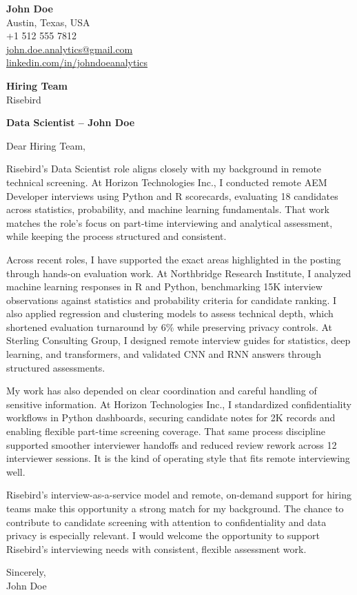 \documentclass[11pt, a4paper]{article}
\begin{document}
\textbf{John Doe}\\
Austin, Texas, USA\\
+1 512 555 7812\\
\href{mailto:john.doe.analytics@gmail.com}{john.doe.analytics@gmail.com}\\
\href{https://www.linkedin.com/in/johndoeanalytics}{linkedin.com/in/johndoeanalytics}

\vspace{1cm}

\textbf{Hiring Team}\\
Risebird\\

\vspace{1cm}

\textbf{Data Scientist – John Doe}

Dear Hiring Team,

Risebird’s Data Scientist role aligns closely with my background in remote technical screening. At Horizon Technologies Inc., I conducted remote AEM Developer interviews using Python and R scorecards, evaluating 18 candidates across statistics, probability, and machine learning fundamentals. That work matches the role’s focus on part-time interviewing and analytical assessment, while keeping the process structured and consistent.

Across recent roles, I have supported the exact areas highlighted in the posting through hands-on evaluation work. At Northbridge Research Institute, I analyzed machine learning responses in R and Python, benchmarking 15K interview observations against statistics and probability criteria for candidate ranking. I also applied regression and clustering models to assess technical depth, which shortened evaluation turnaround by 6\% while preserving privacy controls. At Sterling Consulting Group, I designed remote interview guides for statistics, deep learning, and transformers, and validated CNN and RNN answers through structured assessments.

My work has also depended on clear coordination and careful handling of sensitive information. At Horizon Technologies Inc., I standardized confidentiality workflows in Python dashboards, securing candidate notes for 2K records and enabling flexible part-time screening coverage. That same process discipline supported smoother interviewer handoffs and reduced review rework across 12 interviewer sessions. It is the kind of operating style that fits remote interviewing well.

Risebird’s interview-as-a-service model and remote, on-demand support for hiring teams make this opportunity a strong match for my background. The chance to contribute to candidate screening with attention to confidentiality and data privacy is especially relevant. I would welcome the opportunity to support Risebird’s interviewing needs with consistent, flexible assessment work.

Sincerely,\\
John Doe
\end{document}
